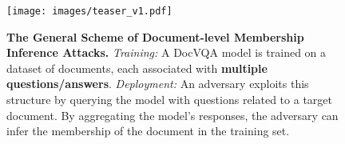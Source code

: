 \begin{figure}[t]
    \centering
    \texttt{[image: images/teaser\_v1.pdf]}
    \caption{\textbf{The General Scheme of Document-level Membership Inference Attacks.} \textit{Training:} A DocVQA model is trained on a dataset of documents, each associated with \textbf{multiple questions/answers}. \textit{Deployment:} An adversary exploits this structure by querying the model with questions related to a target document. By aggregating the model's responses, the adversary can infer the membership of the document in the training set.}
    \label{fig:teaser}
\vspace{-0.2in}
\end{figure}